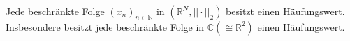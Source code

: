 Jede beschränkte Folge $(x_n)_{n \in \mathbb{N}}$ in $(\mathbb{R}^N, ||\cdot||_2)$ besitzt einen Häufungswert. Insbesondere besitzt jede beschränkte Folge in $\mathbb{C} (\cong \mathbb{R}^2)$ einen Häufungswert.